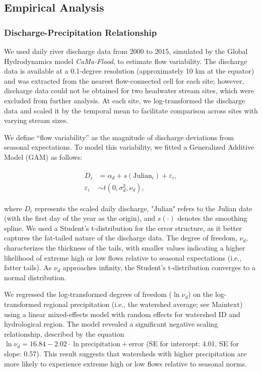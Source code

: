 \documentclass[11pt, class=article, crop=false]{standalone}
\begin{document}
\newpage

\subsection{Empirical Analysis}

\subsubsection{Discharge-Precipitation Relationship}
We used daily river discharge data from 2000 to 2015, simulated by the Global Hydrodynamics model \textit{CaMa-Flood}, to estimate flow variability.
The discharge data is available at a 0.1-degree resolution (approximately 10 km at the equator) and was extracted from the nearest flow-connected cell for each site; however, discharge data could not be obtained for two headwater stream sites, which were excluded from further analysis.
At each site, we log-transformed the discharge data and scaled it by the temporal mean to facilitate comparison across sites with varying stream sizes.

We define ``flow variability'' as the magnitude of discharge deviations from seasonal expectations.
To model this variability, we fitted a Generalized Additive Model (GAM) as follows:

\begin{align}
    \begin{split}
    D_i &= \alpha_d + s(\text{Julian}_i) + \varepsilon_i,\\
    \varepsilon_i &\sim t(0, \sigma_d^2, \nu_d),
    \end{split}
\end{align}

where $D_i$ represents the scaled daily discharge, "Julian" refers to the Julian date (with the first day of the year as the origin), and $s(\cdot)$ denotes the smoothing spline.
We used a Student's t-distribution for the error structure, as it better captures the fat-tailed nature of the discharge data.
The degree of freedom, $\nu_d$, characterizes the thickness of the tails, with smaller values indicating a higher likelihood of extreme high or low flows relative to seasonal expectations (i.e., fatter tails).
As $\nu_d$ approaches infinity, the Student's t-distribution converges to a normal distribution.

We regressed the log-transformed degrees of freedom ($\ln \nu_d$) on the log-transformed regional precipitation (i.e., the watershed average; see Maintext) using a linear mixed-effects model with random effects for watershed ID and hydrological region.
The model revealed a significant negative scaling relationship, described by the equation $\ln \nu_d = 16.84 - 2.02 \cdot \ln \text{precipitation} + \text{error}$ (SE for intercept: 4.01, SE for slope: 0.57).
This result suggests that watersheds with higher precipitation are more likely to experience extreme high or low flows relative to seasonal norms.


\end{document}
